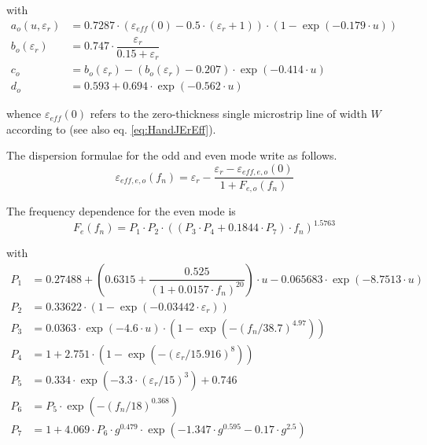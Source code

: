 \documentclass[10pt]{report}
\begin{document}
with
\begin{align}
a_o\left(u,\varepsilon_r\right) &= 0.7287\cdot\left( \varepsilon_{eff}(0) - 0.5\cdot \left( \varepsilon_r + 1\right) \right) \cdot
      \left(1-\exp{\left(-0.179\cdot u\right)}\right)\\
b_o\left(\varepsilon_r\right) &= 0.747\cdot\dfrac{\varepsilon_r}{0.15+\varepsilon_r}\\
c_o &= b_o(\varepsilon_r) - \left(b_o\left(\varepsilon_r\right)-0.207\right)\cdot\exp{\left(-0.414\cdot u\right)}\\
d_o &= 0.593+0.694\cdot\exp{\left(-0.562\cdot u\right)}
\end{align}

whence $\varepsilon_{eff}(0)$ refers to the zero-thickness single
microstrip line of width $W$ according to \cite{Hammerstad} (see also
eq. \eqref{eq:HandJErEff}).

\addvspace{12pt}

The dispersion formulae for the odd and even mode write as follows.
\begin{equation}
\varepsilon_{eff,e,o}\left(f_n\right) = \varepsilon_r - \dfrac{\varepsilon_r - \varepsilon_{eff,e,o}(0)}{1+F_{e,o}\left(f_n\right)}
\end{equation}

The frequency dependence for the even mode is
\begin{equation}
F_e\left(f_n\right) = P_1\cdot P_2\cdot \left(\left(P_3\cdot P_4 + 0.1844\cdot P_7\right)\cdot f_n\right)^{1.5763}
\end{equation}

with
\begin{align}
P_1 &= 0.27488 + \left( 0.6315 + \dfrac{0.525}{(1+0.0157\cdot f_n)^{20}} \right) \cdot u
     -0.065683\cdot\exp{\left(-8.7513\cdot u\right)}\\
P_2 &= 0.33622\cdot \left(1-\exp{\left(-0.03442\cdot\varepsilon_r\right)}\right)\\
P_3 &= 0.0363\cdot\exp{\left(-4.6\cdot u\right)}\cdot\left( 1-\exp\left(
    -\left( f_n / 38.7\right) ^{4.97} \right) \right)\\
P_4 &= 1 + 2.751\cdot\left( 1-\exp\left( -\left( \varepsilon_r/15.916\right) ^8 \right) \right)\\
P_5 &= 0.334\cdot\exp\left( -3.3\cdot\left( \varepsilon_r/15\right) ^3 \right) + 0.746\\
P_6 &= P_5\cdot\exp\left( -\left( f_n/18\right) ^{0.368} \right)\\
P_7 &= 1 + 4.069\cdot P_6 \cdot g^{0.479}\cdot\exp\left(-1.347\cdot g^{0.595} - 0.17\cdot g^{2.5} \right)
\end{align}
\end{document}
